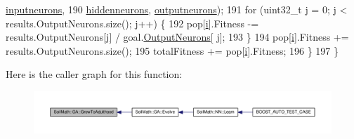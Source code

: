 \begin{DoxyCode}
      \hyperlink{class_soil_math_1_1_g_a_ac32591e30dde5ac854ae57a7b9e33298}{inputneurons},
190                                   \hyperlink{class_soil_math_1_1_g_a_a3f1eee7492f68a05b9b06ee8afb2ec20}{hiddenneurons}, \hyperlink{class_soil_math_1_1_g_a_ab454f9968d5ce2a294b89f85c9d3a74f}{outputneurons});
191     \textcolor{keywordflow}{for} (uint32\_t \hyperlink{_comparision_pictures_2_createtest_image_8m_ac86694252f8dfdb19aaeadc4b7c342c6}{j} = 0; \hyperlink{_comparision_pictures_2_createtest_image_8m_ac86694252f8dfdb19aaeadc4b7c342c6}{j} < results.OutputNeurons.size(); \hyperlink{_comparision_pictures_2_createtest_image_8m_ac86694252f8dfdb19aaeadc4b7c342c6}{j}++) \{
192       pop[\hyperlink{_comparision_pictures_2_createtest_image_8m_a6f6ccfcf58b31cb6412107d9d5281426}{i}].Fitness -= results.OutputNeurons[\hyperlink{_comparision_pictures_2_createtest_image_8m_ac86694252f8dfdb19aaeadc4b7c342c6}{j}] / goal.\hyperlink{struct_predict__struct_aa0708cae93baa061f21452537e86d3bd}{OutputNeurons}[
      \hyperlink{_comparision_pictures_2_createtest_image_8m_ac86694252f8dfdb19aaeadc4b7c342c6}{j}];
193     \}
194     pop[\hyperlink{_comparision_pictures_2_createtest_image_8m_a6f6ccfcf58b31cb6412107d9d5281426}{i}].Fitness += results.OutputNeurons.size();
195     totalFitness += pop[\hyperlink{_comparision_pictures_2_createtest_image_8m_a6f6ccfcf58b31cb6412107d9d5281426}{i}].Fitness;
196   \}
197 \}
\end{DoxyCode}


Here is the caller graph for this function\+:
\nopagebreak
\begin{figure}[H]
\begin{center}
\leavevmode
\includegraphics[width=350pt]{class_soil_math_1_1_g_a_aff791f50f889beb74e854942f8883b58_icgraph}
\end{center}
\end{figure}


\hypertarget{class_soil_math_1_1_g_a_aa39c76b7958bfc80b713389a6f0c6b97}{}
